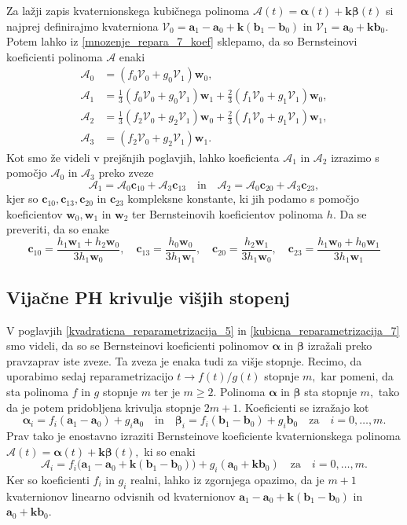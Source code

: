 \documentclass[12pt,a4paper,twoside]{article}
\theoremstyle{definition} %
\theoremstyle{plain} %
\theoremstyle{primerstyle}
\numberwithin{equation}{section}  %
\newcommand{\aV}{\mathbf{a}}
\newcommand{\bV}{\mathbf{b}}
\newcommand{\cV}{\mathbf{c}}
\newcommand{\kV}{\mathbf{k}}
\newcommand{\wV}{\mathbf{w}}
\newcommand{\AQ}{\mathcal{A}}
\newcommand{\VQ}{\mathcal{V}}
\newcommand{\balpha}{\boldsymbol \alpha}
\newcommand{\bbeta}{\boldsymbol \beta}
\begin{document}
Za lažji zapis kvaternionskega kubičnega polinoma $\AQ(t)=\balpha(t)+\kV\bbeta(t)$ si najprej definirajmo kvaterniona $\VQ_0=\aV_1-\aV_0+\kV(\bV_1-\bV_0)$ in $\VQ_1=\aV_0+\kV\bV_0.$ Potem lahko iz \eqref{mnozenje_repara_7_koef} sklepamo, da so Bernsteinovi koeficienti polinoma $\AQ$ enaki
\begin{align*}
	\AQ_0&=(f_0\VQ_0+g_0\VQ_1)\wV_0,\\
	\AQ_1&=\frac{1}{3}(f_0\VQ_0+g_0\VQ_1)\wV_1+\frac{2}{3}(f_1\VQ_0+g_1\VQ_1)\wV_0,\\
	\AQ_2&=\frac{1}{3}(f_2\VQ_0+g_2\VQ_1)\wV_0+\frac{2}{3}(f_1\VQ_0+g_1\VQ_1)\wV_1,\\
	\AQ_3&=(f_2\VQ_0+g_2\VQ_1)\wV_1.
\end{align*}
Kot smo že videli v prejšnjih poglavjih, lahko koeficienta $\AQ_1$ in $\AQ_2$ izrazimo s pomočjo $\AQ_0$ in $\AQ_3$ preko zveze
\begin{equation*}
	\AQ_1=\AQ_0\cV_{10}+\AQ_3\cV_{13}\quad\text{in}\quad\AQ_2=\AQ_0\cV_{20}+\AQ_3\cV_{23},
\end{equation*}
kjer so $\cV_{10},\cV_{13},\cV_{20}$ in $\cV_{23}$ kompleksne konstante, ki jih podamo s pomočjo koeficientov $\wV_0,\wV_1$ in $\wV_2$ ter Bernsteinovih koeficientov polinoma $h.$ Da se preveriti, da so enake
\begin{equation}
	\cV_{10}=\frac{h_1\wV_1+h_2\wV_0}{3h_1\wV_0},\quad\cV_{13}=\frac{h_0\wV_0}{3h_1\wV_1},\quad\cV_{20}=\frac{h_2\wV_1}{3h_1\wV_0},\quad\cV_{23}=\frac{h_1\wV_0+h_0\wV_1}{3h_1\wV_1}
\end{equation}

\subsection{Vijačne PH krivulje višjih stopenj}

V poglavjih \ref{kvadraticna_reparametrizacija_5} in \ref{kubicna_reparametrizacija_7} smo videli, da so se Bernsteinovi koeficienti polinomov $\balpha$ in $\bbeta$ izražali preko pravzaprav iste zveze. Ta zveza je enaka tudi za višje stopnje. Recimo, da uporabimo sedaj reparametrizacijo $t\to f(t)/g(t)$ stopnje $m,$ kar pomeni, da sta polinoma $f$ in $g$ stopnje $m$ ter je $m\geq 2.$ Polinoma $\balpha$ in $\bbeta$ sta stopnje $m,$ tako da je potem pridobljena krivulja stopnje $2m+1.$ Koeficienti se izražajo kot
\begin{equation*}
	\balpha_i=f_i(\aV_1-\aV_0)+g_i\aV_0\quad\text{in}\quad\bbeta_i=f_i(\bV_1-\bV_0)+g_i\bV_0\quad\text{za}\quad i=0,\dots,m.
\end{equation*}
Prav tako je enostavno izraziti Bernsteinove koeficiente kvaternionskega polinoma $\AQ(t)=\balpha(t)+\kV\bbeta(t),$ ki so enaki
\begin{equation*}
	\AQ_i=f_i\big(\aV_1-\aV_0+\kV(\bV_1-\bV_0)\big)+g_i(\aV_0+\kV\bV_0)\quad\text{za}\quad i=0,\dots,m.
\end{equation*}
Ker so koeficienti $f_i$ in $g_i$ realni, lahko iz zgornjega opazimo, da je $m+1$ kvaternionov linearno odvisnih od kvaternionov $\aV_1-\aV_0+\kV(\bV_1-\bV_0)$ in $\aV_0+\kV\bV_0.$
\end{document}
